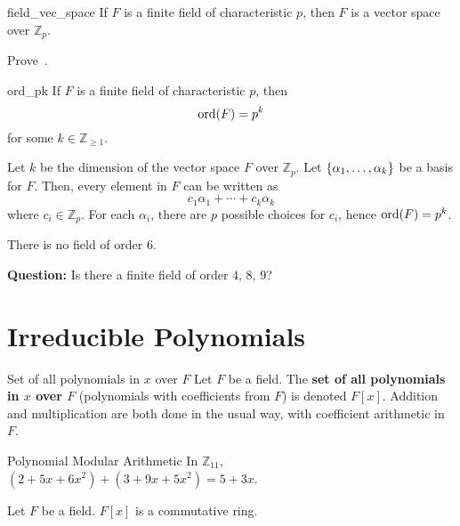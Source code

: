 \begin{Theorem}{}{field_vec_space}
    If $ F $ is a finite field of characteristic $ p $, then $ F $
    is a vector space over $ \mathbb{Z}_p $.
\end{Theorem}

\begin{Exercise}{}{}
    Prove~.
\end{Exercise}

\begin{Theorem}{}{ord_pk}
    If $ F $ is a finite field of characteristic $ p $, then
    \[ \operatorname{ord}(F)=p^k \]
    for some $ k\in\mathbb{Z}_{\geqslant 1} $.
\end{Theorem}

\begin{Proof}{}{}
    Let $ k $ be the dimension of the vector space $ F $ over $ \mathbb{Z}_p $.
    Let $ \{\alpha_1,\ldots ,\alpha_k\} $ be a basis for $ F $. Then, every element
    in $ F $ can be written as
    \[ c_1\alpha_1+\cdots+c_k\alpha_k \]
    where $ c_i\in\mathbb{Z}_p $. For each $ \alpha_i $, there are $ p $
    possible choices for $ c_i $, hence $ \operatorname{ord}(F)=p^k $.
\end{Proof}

\begin{Example}{}{}
    There is no field of order $ 6 $.
\end{Example}

\textbf{Question:} Is there a finite field of order $ 4,\,8,\,9 $?

\section{Irreducible Polynomials}

\begin{Definition}{Set of all polynomials in $ x $ over $ F $}{}
    Let $ F $ be a field. The \textbf{set of all polynomials in $ x $ over $ F $}
    (polynomials with coefficients from $ F $) is denoted $ F[x] $. Addition
    and multiplication are both done in the usual way, with coefficient arithmetic
    in $ F $.
\end{Definition}

\begin{Example}{Polynomial Modular Arithmetic}{}
    In $ \mathbb{Z}_{11} $, $ (2+5x+6x^2)+(3+9x+5x^2)=5+3x $.
\end{Example}

\begin{Theorem}{}{}
    Let $ F $ be a field. $ F[x] $ is a commutative ring.
\end{Theorem}

